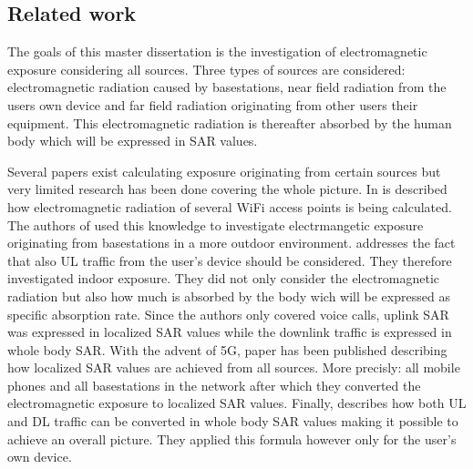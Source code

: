 
\subsection{Related work} %
\label{sub:general}
The goals of this master dissertation is the investigation of electromagnetic exposure considering all sources. Three types of sources are considered: electromagnetic radiation 
caused by basestations, near field radiation from the users own device and far field radiation originating from other users their equipment. This electromagnetic radiation is thereafter
absorbed by the human body which will be expressed in \gls{SAR} values.

Several papers exist calculating exposure originating from certain sources but very limited research has been done covering the whole picture.
In \cite{J6_originalExposureFormula} is described how electromagnetic radiation of several WiFi access points is being calculated. The authors of \cite{J1} used this knowledge 
to investigate electrmangetic exposure originating from basestations in a more outdoor environment. \cite{J10_RDP, J10.1} addresses the fact that 
also \gls{UL} traffic from the user's device should be considered. They therefore investigated indoor exposure. They did not only consider the electromagnetic radiation
but also how much is absorbed by the body wich will be expressed as specific absorption rate. Since the authors only covered voice calls,
uplink SAR was expressed in localized SAR values while the downlink traffic is expressed in whole body SAR. With the advent of 5G, paper \cite{J17_kuehn2019modelling} has been 
published describing how localized SAR values are achieved from all sources. More precisly: all mobile phones and all basestations in the network after which they converted the electromagnetic 
exposure to localized SAR values.
Finally, \cite{J22_plets2015joint} describes how both \gls{UL} and \gls{DL} traffic can be converted in whole body SAR values making it possible to achieve an overall picture. They applied this formula 
however only for the user's own device.

